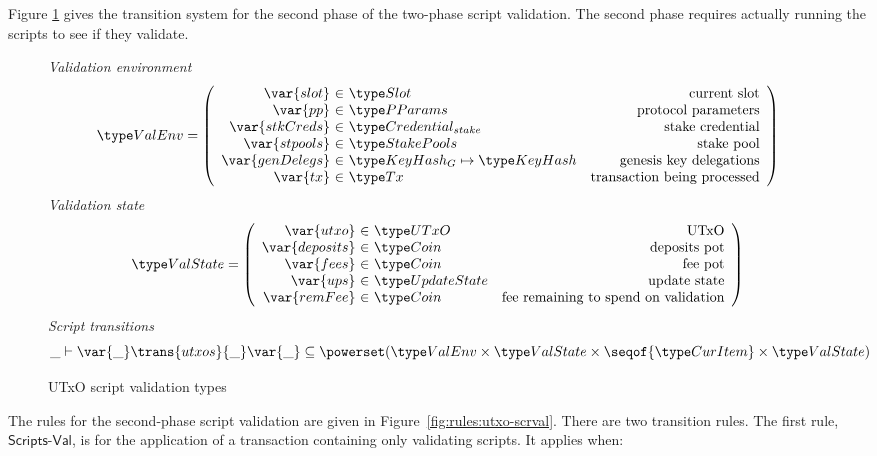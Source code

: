 Figure \ref{fig:ts-types:utxo-scripts} gives the transition system for the second phase of
the two-phase script validation. The second phase requires actually running
the scripts to see if they validate.

\begin{figure}[htb]
  \emph{Validation environment}
  \begin{equation*}
    \ValEnv =
    \left(
      \begin{array}{r@{~\in~}lr}
        \var{slot} & \Slot & \text{current slot}\\
        \var{pp} & \PParams & \text{protocol parameters}\\
        \var{stkCreds} & \StakeCredential & \text{stake credential}\\
        \var{stpools} & \StakePools & \text{stake pool}\\
        \var{genDelegs} & \KeyHashGen\mapsto\KeyHash & \text{genesis key delegations} \\
        \var{tx} & \Tx & \text{transaction being processed} \\
      \end{array}
    \right)
  \end{equation*}
  \emph{Validation state}
  \begin{equation*}
    \ValState =
    \left(
      \begin{array}{r@{~\in~}lr}
        \var{utxo} & \UTxO & \text{UTxO}\\
        \var{deposits} & \Coin & \text{deposits pot}\\
        \var{fees} & \Coin & \text{fee pot}\\
        \var{ups} & \UpdateState & \text{update state}\\
        \var{remFee} & \Coin & \text{fee remaining to spend on validation} \\
      \end{array}
    \right)
  \end{equation*}
  \emph{Script transitions}
  \begin{equation*}
    \_ \vdash
    \var{\_} \trans{utxos}{\_} \var{\_}
    \subseteq \powerset (\ValEnv \times \ValState \times \seqof{\CurItem} \times \ValState)
  \end{equation*}
  \caption{UTxO script validation types}
  \label{fig:ts-types:utxo-scripts}
\end{figure}

The rules for the second-phase script validation are given in
Figure~\ref{fig:rules:utxo-scrval}. There are two transition rules.
The first rule, $\mathsf{Scripts\mbox{-}Val}$,
is for the application of a transaction containing only
validating scripts. It applies when:

